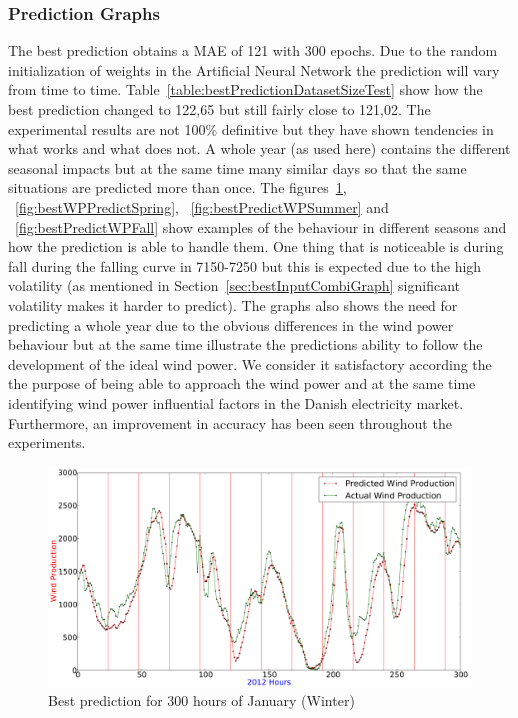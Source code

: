 \subsubsection{Prediction Graphs}
\label{sec:windPowerBestPredictionGraphs}
The best prediction obtains a MAE of 121 with 300 epochs. Due to the random initialization of weights in the Artificial Neural Network the prediction will vary from time to time. Table~\ref{table:bestPredictionDatasetSizeTest} show how the best prediction changed to 122,65 but still fairly close to 121,02. The experimental results are not 100\% definitive but they have shown tendencies in what works and what does not. A whole year (as used here) contains the different seasonal impacts but at the same time many similar days so that the same situations are predicted more than once. The figures~\ref{fig:bestWPPredictWinter}, ~\ref{fig:bestWPPredictSpring}, ~\ref{fig:bestPredictWPSummer} and ~\ref{fig:bestPredictWPFall} show examples of the behaviour in different seasons and how the prediction is able to handle them. One thing that is noticeable is during fall during the falling curve in 7150-7250 but this is expected due to the high volatility (as mentioned in Section~\ref{sec:bestInputCombiGraph} significant volatility makes it harder to predict). The graphs also shows the need for predicting a whole year due to the obvious differences in the wind power behaviour but at the same time illustrate the predictions ability to follow the development of the ideal wind power. We consider it satisfactory according the the purpose of being able to approach the wind power and at the same time identifying wind power influential factors in the Danish electricity market. Furthermore, an improvement in accuracy has been seen throughout the experiments.

\begin{figure}[H]
\centering
\includegraphics[width=0.99\linewidth]{billeder/bestPossiblePredictionWindProduction0-300.png}
\caption{Best prediction for 300 hours of January (Winter)}
\label{fig:bestWPPredictWinter}
\end{figure}

